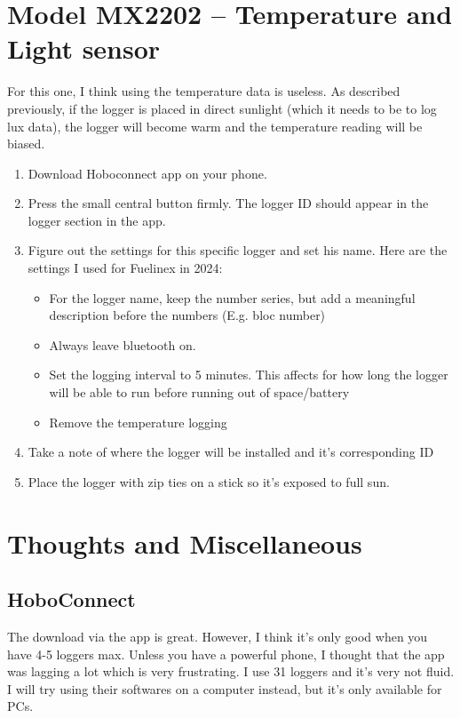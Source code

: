 \documentclass[11pt]{article}
\begin{document}
\section{Model MX2202 -- Temperature and Light sensor}
For this one, I think using the temperature data is useless. As described previously, if the logger is placed in direct sunlight (which it needs to be to log lux data), the logger will become warm and the temperature reading will be biased. 
\begin {enumerate}
	\item Download Hoboconnect app on your phone.
	\item Press the small central button firmly. The logger ID should appear in the logger section in the app. 
	\item Figure out the settings for this specific logger and set his name. Here are the settings I used for Fuelinex in 2024:
		\begin {itemize}
			\item For the logger name, keep the number series, but add a meaningful description before the numbers (E.g. bloc number)
			\item Always leave bluetooth on. 
			\item Set the logging interval to 5 minutes. This affects for how long the logger will be able to run before running out of space/battery
			\item Remove the temperature logging
		\end {itemize}
	\item Take a note of where the logger will be installed and it's corresponding ID
	\item Place the logger with zip ties on a stick so it's exposed to full sun. 
\end {enumerate}

\section {Thoughts and Miscellaneous}
\subsection {HoboConnect}
The download via the app is great. However, I think it's only good when you have 4-5 loggers max. Unless you have a powerful phone, I thought that the app was lagging a lot which is very frustrating. I use 31 loggers and it's very not fluid. I will try using their softwares on a computer instead, but it's only available for PCs.

\end{document}
